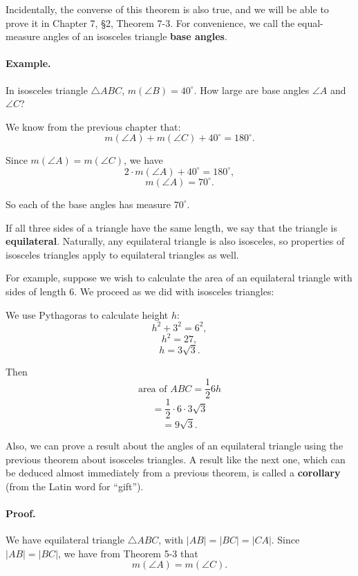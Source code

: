 \documentclass[12pt]{book} %
\begin{document}
Incidentally, the converse of this theorem is also true, and we will be able to prove it in Chapter 7, \S 2, Theorem 7-3. For convenience, we call the equal-measure angles of an isosceles triangle \textbf{base angles}.

\paragraph{Example.}
In isosceles triangle $\triangle ABC$, $m(\angle B)=40^\circ$. How large are base angles $\angle A$ and $\angle C$?


We know from the previous chapter that:
\[
m(\angle A)+m(\angle C)+40^\circ=180^\circ.
\]

Since $m(\angle A)=m(\angle C)$, we have
\[
2\cdot m(\angle A)+40^\circ=180^\circ,
\]
\[
m(\angle A)=70^\circ.
\]

So each of the base angles has measure $70^\circ$.

If all three sides of a triangle have the same length, we say that the triangle is \textbf{equilateral}. Naturally, any equilateral triangle is also isosceles, so properties of isosceles triangles apply to equilateral triangles as well.

For example, suppose we wish to calculate the area of an equilateral triangle with sides of length 6. We proceed as we did with isosceles triangles:


We use Pythagoras to calculate height $h$:
\[
h^2+3^2=6^2,
\]
\[
h^2=27,
\]
\[
h=3\sqrt{3}.
\]

Then
\[
\text{area of }ABC=\frac12 6h
\]
\[
=\frac12\cdot 6\cdot 3\sqrt{3}
\]
\[
=9\sqrt{3}.
\]

Also, we can prove a result about the angles of an equilateral triangle using the previous theorem about isosceles triangles. A result like the next one, which can be deduced almost immediately from a previous theorem, is called a \textbf{corollary} (from the Latin word for ``gift'').



\paragraph{Proof.}
We have equilateral triangle $\triangle ABC$, with $|AB|=|BC|=|CA|$.
Since $|AB|=|BC|$, we have from Theorem 5-3 that
\[
m(\angle A)=m(\angle C).
\]
\end{document}
